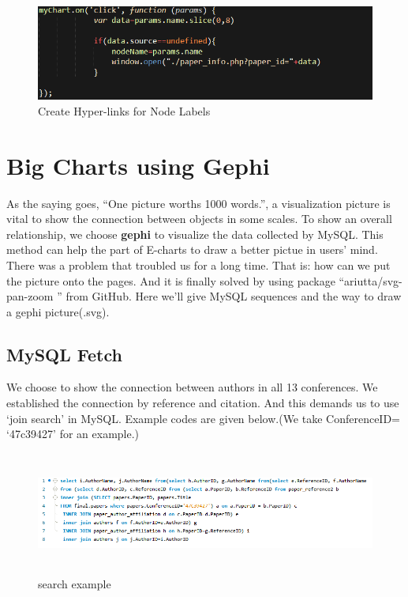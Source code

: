 \documentclass{book}
\begin{document}
\begin{figure}[H]
\centering
\includegraphics[scale=0.55]{img/zlt_rel_code_label.png}
\caption{Create Hyper-links for Node Labels}
\end{figure}


\section{Big Charts using Gephi}

As the saying goes, ``One picture worths 1000 words.'', a visualization picture is vital to show the connection between objects in some scales. To show an overall relationship, we choose  \textbf{gephi} to visualize the data collected by MySQL. This method can help the part of E-charts to draw a better pictue in users' mind. 
There was a problem that troubled us for a long time. That is: how can we put the picture onto the pages. And it is finally solved by using package ``ariutta/svg-pan-zoom
'' from GitHub. 
Here we'll give MySQL sequences and the way to draw a gephi picture(.svg).

\subsection{MySQL Fetch}

We choose to show the connection between authors in all 13 conferences. We established the connection by reference and citation. And this demands us to use `join search' in MySQL. Example codes are given below.(We take ConferenceID= `47c39427' for an example.)

\begin{figure}[H]
\centering
\includegraphics[height=4.0cm,width=18cm]{img/yhb_my_1.png}
\caption{search example}
\end{figure}
\end{document}

